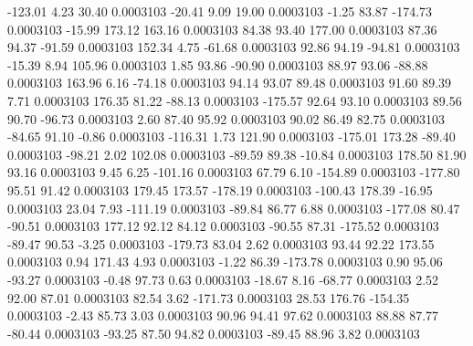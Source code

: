      -123.01        4.23       30.40     0.0003103
      -20.41        9.09       19.00     0.0003103
       -1.25       83.87     -174.73     0.0003103
      -15.99      173.12      163.16     0.0003103
       84.38       93.40      177.00     0.0003103
       87.36       94.37      -91.59     0.0003103
      152.34        4.75      -61.68     0.0003103
       92.86       94.19      -94.81     0.0003103
      -15.39        8.94      105.96     0.0003103
        1.85       93.86      -90.90     0.0003103
       88.97       93.06      -88.88     0.0003103
      163.96        6.16      -74.18     0.0003103
       94.14       93.07       89.48     0.0003103
       91.60       89.39        7.71     0.0003103
      176.35       81.22      -88.13     0.0003103
     -175.57       92.64       93.10     0.0003103
       89.56       90.70      -96.73     0.0003103
        2.60       87.40       95.92     0.0003103
       90.02       86.49       82.75     0.0003103
      -84.65       91.10       -0.86     0.0003103
     -116.31        1.73      121.90     0.0003103
     -175.01      173.28      -89.40     0.0003103
      -98.21        2.02      102.08     0.0003103
      -89.59       89.38      -10.84     0.0003103
      178.50       81.90       93.16     0.0003103
        9.45        6.25     -101.16     0.0003103
       67.79        6.10     -154.89     0.0003103
     -177.80       95.51       91.42     0.0003103
      179.45      173.57     -178.19     0.0003103
     -100.43      178.39      -16.95     0.0003103
       23.04        7.93     -111.19     0.0003103
      -89.84       86.77        6.88     0.0003103
     -177.08       80.47      -90.51     0.0003103
      177.12       92.12       84.12     0.0003103
      -90.55       87.31     -175.52     0.0003103
      -89.47       90.53       -3.25     0.0003103
     -179.73       83.04        2.62     0.0003103
       93.44       92.22      173.55     0.0003103
        0.94      171.43        4.93     0.0003103
       -1.22       86.39     -173.78     0.0003103
        0.90       95.06      -93.27     0.0003103
       -0.48       97.73        0.63     0.0003103
      -18.67        8.16      -68.77     0.0003103
        2.52       92.00       87.01     0.0003103
       82.54        3.62     -171.73     0.0003103
       28.53      176.76     -154.35     0.0003103
       -2.43       85.73        3.03     0.0003103
       90.96       94.41       97.62     0.0003103
       88.88       87.77      -80.44     0.0003103
      -93.25       87.50       94.82     0.0003103
      -89.45       88.96        3.82     0.0003103
